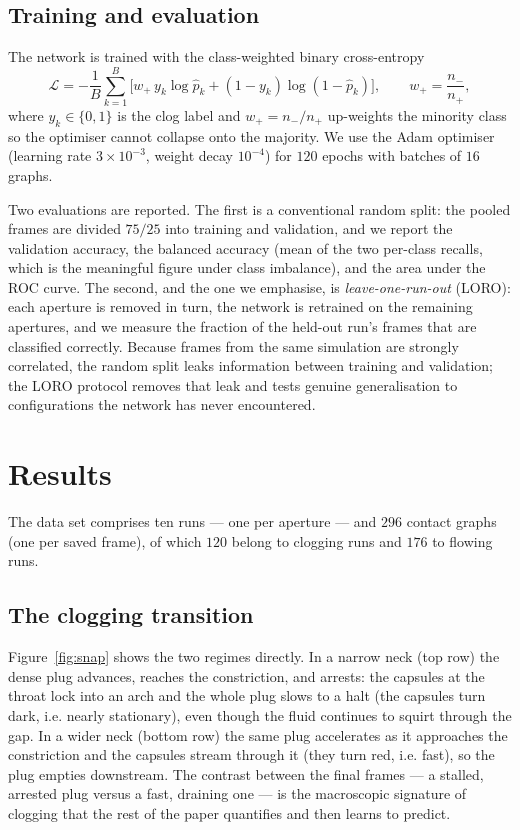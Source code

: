 \documentclass[11pt,a4paper]{article}
\begin{document}
\subsection{Training and evaluation}
\label{sec:training}

The network is trained with the class-weighted binary cross-entropy
\begin{equation}
\mathcal L=-\frac{1}{B}\sum_{k=1}^{B}
\Big[w_{+}\,y_k\log\hat p_k+(1-y_k)\log(1-\hat p_k)\Big],
\qquad w_{+}=\frac{n_-}{n_+},
\label{eq:bce}
\end{equation}
where $y_k\in\{0,1\}$ is the clog label and $w_{+}=n_-/n_+$ up-weights
the minority class so the optimiser cannot collapse onto the majority.
We use the Adam optimiser (learning rate $3\times10^{-3}$, weight decay
$10^{-4}$) for $120$ epochs with batches of $16$ graphs.

Two evaluations are reported. The first is a conventional random split:
the pooled frames are divided $75/25$ into training and validation, and
we report the validation accuracy, the balanced accuracy (mean of the
two per-class recalls, which is the meaningful figure under class
imbalance), and the area under the ROC curve. The second, and the one we
emphasise, is \emph{leave-one-run-out} (LORO): each aperture is removed
in turn, the network is retrained on the remaining apertures, and we
measure the fraction of the held-out run's frames that are classified
correctly. Because frames from the same simulation are strongly
correlated, the random split leaks information between training and
validation; the LORO protocol removes that leak and tests genuine
generalisation to configurations the network has never encountered.

\section{Results}
\label{sec:results}

The data set comprises ten runs --- one per aperture --- and $296$
contact graphs (one per saved frame), of which $120$ belong to clogging
runs and $176$ to flowing runs.

\subsection{The clogging transition}
\label{sec:res-phase}

Figure~\ref{fig:snap} shows the two regimes directly. In a narrow neck
(top row) the dense plug advances, reaches the constriction, and arrests:
the capsules at the throat lock into an arch and the whole plug slows to
a halt (the capsules turn dark, i.e. nearly stationary), even though the
fluid continues to squirt through the gap. In a wider neck (bottom row)
the same plug accelerates as it approaches the constriction and the
capsules stream through it (they turn red, i.e. fast), so the plug
empties downstream. The contrast between the final frames --- a stalled,
arrested plug versus a fast, draining one --- is the macroscopic
signature of clogging that the rest of the paper quantifies and then
learns to predict.
\end{document}
